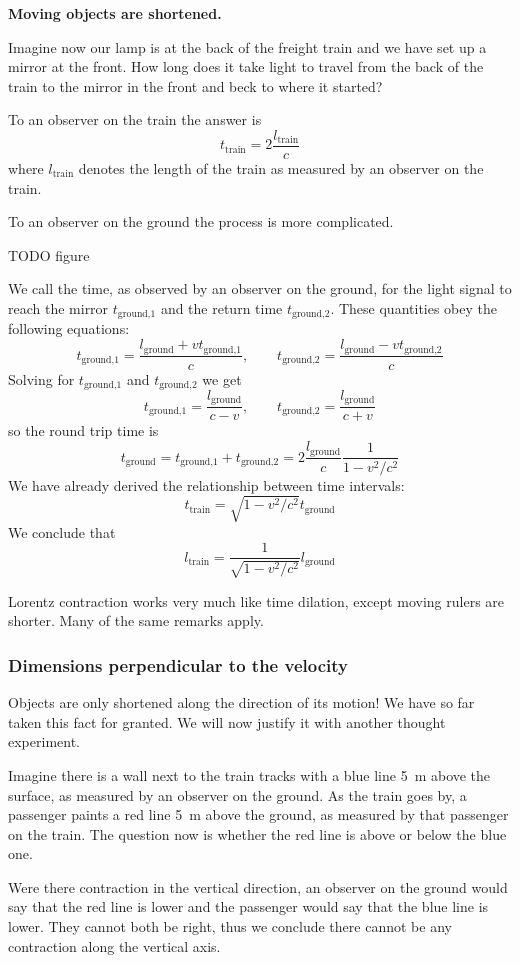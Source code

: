 \begin{center}
\textbf{Moving objects are shortened.}
\end{center}
\begin{example}
Imagine now our lamp is at the back of the freight train and we have set up a mirror at the front. How long does it take light to travel from the back of the train to the mirror in the front and beck to where it started?

To an observer on the train the answer is
\[ t_\text{train} = 2 \frac{l_\text{train}}{c} \]
where $l_\text{train}$ denotes the length of the train as measured by an observer on the train.

To an observer on the ground the process is more complicated.

TODO figure

We call the time, as observed by an observer on the ground, for the light signal to reach the mirror $t_\text{ground,1}$ and the return time $t_\text{ground,2}$.
These quantities obey the following equations:
\[ t_\text{ground,1} = \frac{l_\text{ground} + v t_\text{ground,1}}{c}, \qquad t_\text{ground,2} = \frac{l_\text{ground} - v t_\text{ground,2}}{c}\]
Solving for $t_\text{ground,1}$ and $t_\text{ground,2}$ we get
\[ t_\text{ground,1} = \frac{l_\text{ground}}{c-v}, \qquad t_\text{ground,2} = \frac{l_\text{ground}}{c+v} \]
so the round trip time is
\[ t_\text{ground} = t_\text{ground,1} + t_\text{ground,2} = 2\frac{l_\text{ground}}{c}\frac{1}{1-v^2/c^2} \]
We have already derived the relationship between time intervals:
\[ t_\text{train} = \sqrt{1-v^2/c^2}t_\text{ground} \]
We conclude that
\[l_\text{train} = \frac{1}{\sqrt{1-v^2/c^2}}l_\text{ground}\]
\end{example}
Lorentz contraction works very much like time dilation, except moving rulers are shorter. Many of the same remarks apply.

\subsubsection{Dimensions perpendicular to the velocity} Objects are only shortened along the direction of its motion! We have so far taken this fact for granted. We will now justify it with another thought experiment.

\begin{example}
Imagine there is a wall next to the train tracks with a blue line \SI{5}{m} above the surface, as measured by an observer on the ground. As the train goes by, a passenger paints a red line \SI{5}{m} above the ground, as measured by that passenger on the train. The question now is whether the red line is above or below the blue one.

Were there contraction in the vertical direction, an observer on the ground would say that the red line is lower and the passenger would say that the blue line is lower. They cannot both be right, thus we conclude there cannot be any contraction along the vertical axis.
\end{example}

